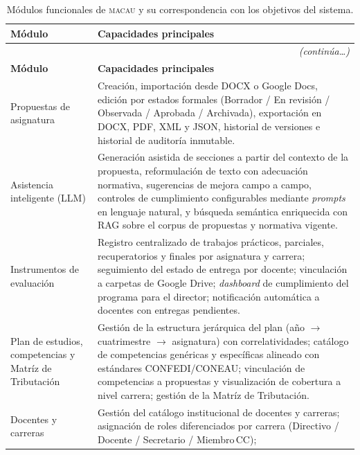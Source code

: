 \setlength{\extrarowheight}{4pt}
\begin{longtable}{p{3.6cm} p{10.8cm}}
\caption{Módulos funcionales de \textsc{macau} y su correspondencia con los objetivos del sistema.}
\label{tab:modulos_macau} \\
\toprule
\textbf{Módulo} & \textbf{Capacidades principales} \\
\midrule
\endfirsthead
\multicolumn{2}{r}{\small\textit{(continúa\ldots)}} \\[2pt]
\toprule
\textbf{Módulo} & \textbf{Capacidades principales} \\
\midrule
\endhead
\bottomrule
\endfoot
Propuestas de asignatura
  & Creación, importación desde DOCX o Google Docs, edición por estados formales
    (Borrador / En revisión / Observada / Aprobada / Archivada), exportación
    en DOCX, PDF, XML y JSON, historial de versiones e historial de auditoría inmutable. \\
\arrayrulecolor{gray!35}\hline\arrayrulecolor{black}
Asistencia inteligente (LLM)
  & Generación asistida de secciones a partir del contexto de la propuesta,
    reformulación de texto con adecuación normativa, sugerencias de mejora campo
    a campo, controles de cumplimiento configurables mediante \textit{prompts} en
    lenguaje natural, y búsqueda semántica enriquecida con RAG sobre el corpus
    de propuestas y normativa vigente. \\
\arrayrulecolor{gray!35}\hline\arrayrulecolor{black}
Instrumentos de evaluación
  & Registro centralizado de trabajos prácticos, parciales, recuperatorios y finales
    por asignatura y carrera; seguimiento del estado de entrega por docente;
    vinculación a carpetas de Google Drive; \textit{dashboard} de cumplimiento
    del programa para el director; notificación automática a docentes con
    entregas pendientes. \\
\arrayrulecolor{gray!35}\hline\arrayrulecolor{black}
Plan de estudios, competencias y Matríz de Tributación
  & Gestión de la estructura jerárquica del plan (año $\to$ cuatrimestre $\to$ asignatura)
    con correlatividades; catálogo de competencias
    genéricas y específicas alineado con estándares CONFEDI/CONEAU; vinculación
    de competencias a propuestas y visualización de cobertura a nivel carrera; gestión de la Matríz de Tributación. \\
\arrayrulecolor{gray!35}\hline\arrayrulecolor{black}
Docentes y carreras
  & Gestión del catálogo institucional de docentes y carreras; asignación de roles
    diferenciados por carrera (Directivo / Docente / Secretario / Miembro\,CC);

\end{longtable}
